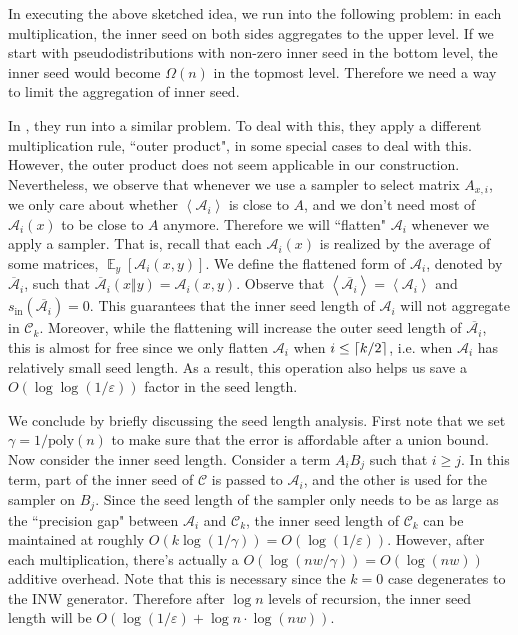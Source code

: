\documentclass[10pt,a4paper]{article}
\DeclareMathOperator*{\Ex}{\mathbb E}
\newcommand{\ex}[2][]{\Ex_{#1}\left[#2\right]}
\newcommand{\inp}[1]{\left\langle#1\right\rangle}
\DeclarePairedDelimiter\ceil{\lceil}{\rceil}
\newcommand{\cA}{\mathcal A}
\newcommand{\cC}{\mathcal C}
\newcommand{\eps}{\varepsilon}
\newcommand{\poly}{\mathrm{poly}}
\newcommand{\si}[1][]{s_{\mathrm{in}#1}}
\begin{document}
In executing the above sketched idea, we run into the following problem: in each multiplication, the inner seed on both sides  aggregates to the upper level. If we start with pseudodistributions with non-zero inner seed in the bottom level, the inner seed would become $\Omega(n)$ in the topmost level. Therefore we need a way to limit the aggregation of inner seed.

In \cite{BCG18}, they run into a similar problem. To deal with this,  they apply a different multiplication rule, ``outer product", in some special cases to deal with this. However, the outer product does not seem applicable in our construction. Nevertheless, we observe that whenever we use a sampler to select matrix $A_{x,i}$, we only care about whether $\inp{\cA_i}$ is close to $A$, and we don't need most of $\cA_i(x)$ to be close to $A$ anymore. Therefore we will ``flatten" $\cA_i$ whenever we apply a sampler. That is, recall that each $\cA_i(x)$ is realized by the average of some matrices, $\ex[y]{\cA_i(x,y)}$. We define the flattened form of $\cA_i$, denoted by $\overline{\cA}_i$, such that $\overline{\cA}_i(x\Vert y)=\cA_i(x,y)$. Observe that $\inp{\overline{\cA_i}}=\inp{\cA_i}$ and $\si(\overline{\cA_i})=0$. This guarantees that the inner seed length of $\cA_i$ will not aggregate in $\cC_k$. Moreover, while the flattening will increase the outer seed length of $\overline{\cA_i}$, this is almost for free since we only flatten $\cA_i$ when $i\le\ceil{k/2}$, i.e. when $\cA_i$ has relatively small seed length. As a result, this operation also helps us save a $O(\log\log(1/\eps))$ factor in the seed length.

We  conclude by briefly discussing the seed length analysis. First note that we set $\gamma=1/\poly(n)$ to make sure that the error is affordable after a union bound. Now consider the inner seed length. Consider a term $A_iB_j$ such that $i\ge j$. In this term, part of the inner seed of $\cC$ is passed to $\cA_i$, and the other is used for the sampler on $B_j$. Since the seed length of the sampler only needs to be as large as the ``precision gap" between $\cA_i$ and $\cC_k$, the inner seed length of $\cC_k$ can be maintained at roughly $O(k\log(1/\gamma))=O(\log(1/\eps))$. However, after each multiplication, there's actually a $O(\log (nw/\gamma))=O(\log (nw))$ additive overhead. Note that this is necessary since the $k=0$ case degenerates to the INW generator. Therefore after $\log n$ levels of recursion, the inner seed length will be $O(\log(1/\eps)+\log n\cdot \log (nw))$. 
\end{document}
